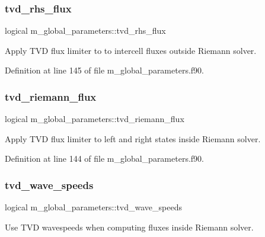 \subsubsection{\texorpdfstring{tvd\+\_\+rhs\+\_\+flux}{tvd\_rhs\_flux}}
{\footnotesize\ttfamily logical m\+\_\+global\+\_\+parameters\+::tvd\+\_\+rhs\+\_\+flux}



Apply T\+VD flux limiter to to intercell fluxes outside Riemann solver. 



Definition at line 145 of file m\+\_\+global\+\_\+parameters.\+f90.

\mbox{\label{namespacem__global__parameters_af2383f23c599d5936d0559dac1edee9b}} 
\subsubsection{\texorpdfstring{tvd\+\_\+riemann\+\_\+flux}{tvd\_riemann\_flux}}
{\footnotesize\ttfamily logical m\+\_\+global\+\_\+parameters\+::tvd\+\_\+riemann\+\_\+flux}



Apply T\+VD flux limiter to left and right states inside Riemann solver. 



Definition at line 144 of file m\+\_\+global\+\_\+parameters.\+f90.

\mbox{\label{namespacem__global__parameters_a4ed04ef4019b9be697d7f13b3d207a17}} 
\subsubsection{\texorpdfstring{tvd\+\_\+wave\+\_\+speeds}{tvd\_wave\_speeds}}
{\footnotesize\ttfamily logical m\+\_\+global\+\_\+parameters\+::tvd\+\_\+wave\+\_\+speeds}



Use T\+VD wavespeeds when computing fluxes inside Riemann solver. 



